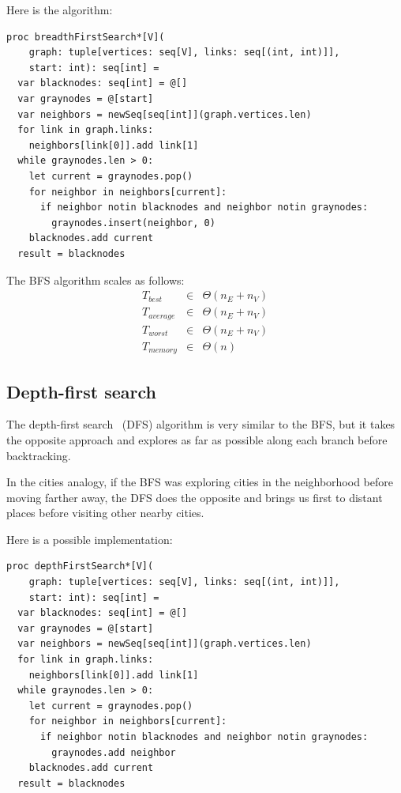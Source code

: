 \documentclass[justified, sixbynine]{tufte-book}
\def\ft{\small\tt}
\theoremstyle{plain}%
\newtheorem * {corollary}{Corollary}
\theoremstyle{definition}
\theoremstyle{remark}
\newtheorem * {remark}{Remark}
\newtheorem * {note}{Note}
\begin{document}
\begin{fullwidth}
Here is the algorithm:

\begin{lstlisting}[caption={in file: {\ft nlib.nim}}]
proc breadthFirstSearch*[V](
    graph: tuple[vertices: seq[V], links: seq[(int, int)]],
    start: int): seq[int] =
  var blacknodes: seq[int] = @[]
  var graynodes = @[start]
  var neighbors = newSeq[seq[int]](graph.vertices.len)
  for link in graph.links:
    neighbors[link[0]].add link[1]
  while graynodes.len > 0:
    let current = graynodes.pop()
    for neighbor in neighbors[current]:
      if neighbor notin blacknodes and neighbor notin graynodes:
        graynodes.insert(neighbor, 0)
    blacknodes.add current
  result = blacknodes
\end{lstlisting}

The BFS algorithm scales as follows:
\begin{eqnarray}
T_{best} &\in &\Theta (n_E+n_V) \\
T_{average} &\in &\Theta (n_E+n_V) \\
T_{worst} &\in &\Theta (n_E+n_V) \\
T_{memory} &\in &\Theta (n)
\end{eqnarray}

\subsection{Depth-first search}


The depth-first search~\cite{dfs} (DFS) algorithm is very similar to the BFS, but it takes the opposite approach and explores as far as possible along each branch before backtracking.

In the cities analogy, if the BFS was exploring cities in the neighborhood before moving farther away, the DFS does the opposite and brings us first to distant places before visiting other nearby cities.

Here is a possible implementation:

\begin{lstlisting}[caption={in file: {\ft nlib.nim}}]
proc depthFirstSearch*[V](
    graph: tuple[vertices: seq[V], links: seq[(int, int)]],
    start: int): seq[int] =
  var blacknodes: seq[int] = @[]
  var graynodes = @[start]
  var neighbors = newSeq[seq[int]](graph.vertices.len)
  for link in graph.links:
    neighbors[link[0]].add link[1]
  while graynodes.len > 0:
    let current = graynodes.pop()
    for neighbor in neighbors[current]:
      if neighbor notin blacknodes and neighbor notin graynodes:
        graynodes.add neighbor
    blacknodes.add current
  result = blacknodes
\end{lstlisting}


\end{fullwidth}
\end{document}
